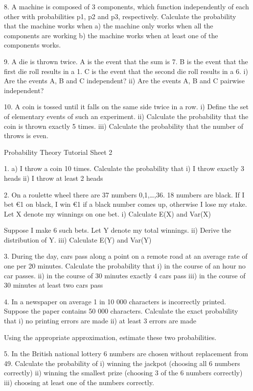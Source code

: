 \documentclass[]{report}
\begin{document}
	8. A machine is composed of 3 components, which function independently of each other with probabilities p1, p2 and p3, respectively. Calculate the probability that the machine works when
	a)	the machine only works when all the components are working
	b)	the machine works when at least one of the components works.
	
	9. A die is thrown twice. A is the event that the sum is 7. B is the event that the first die roll results in a 1. C is the event that the second die roll results in a 6. 
	i)	Are the events A, B and C independent?
	ii)	Are the events A, B and C pairwise independent?
	
	10.	A coin is tossed until it falls on the same side twice in a row.
	i) Define the set of elementary events of such an experiment.
	ii) Calculate the probability that the coin is thrown exactly 5 times.
	iii) Calculate the probability that the number of throws is even. 
	
	
	
	Probability Theory 
	Tutorial Sheet 2
	
	1. a) I throw a coin 10 times. Calculate the probability that 
	i) I throw exactly 3 heads
	ii) I throw at least 2 heads
	
	2. On a roulette wheel there are 37 numbers {0,1,…,36}. 18 numbers are black. If I bet €1 on black, I win €1 if a black number comes up, otherwise I lose my stake. Let X denote my winnings on one bet.
	i)	Calculate E(X) and Var(X)
	
	Suppose I make 6 such bets. Let Y denote my total winnings. 
	ii)	Derive the distribution of Y.
	iii)	Calculate E(Y) and Var(Y)
	
	3. During the day, cars pass along a point on a remote road at an average rate of one per 20 minutes. Calculate the probability that 
	i)	in the course of an hour no car passes. 
	ii)	in the course of 30 minutes exactly 4 cars pass
	iii)	in the course of 30 minutes at least two cars pass
	
	4.	In a newspaper on average 1 in 10 000 characters is incorrectly printed. Suppose the paper contains 50 000 characters. Calculate the exact probability that 
	i)	no printing errors are made
	ii)	at least 3 errors are made
	
	Using the appropriate approximation, estimate these two probabilities. 
	
	5. In the British national lottery 6 numbers are chosen without replacement from 49. Calculate the probability of 
	i)	winning the jackpot (choosing all 6 numbers correctly)
	ii)	winning the smallest prize (choosing 3 of the 6 numbers correctly)
	iii)	choosing at least one of the numbers correctly.
	
\end{document}
